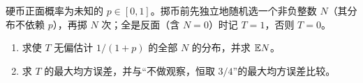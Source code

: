 \begin{exercise}[原讲义例 3.4]\label{ex2:randomN}
硬币正面概率为未知的 $p\in[0,1]$。掷币前先独立地随机选一个非负整数 $N$（其分布不依赖 $p$），再掷 $N$ 次；全是反面（含 $N=0$）时记 $T=1$，否则 $T=0$。
\begin{enumerate}
\item 求使 $T$ 无偏估计 $1/(1+p)$ 的全部 $N$ 的分布，并求 $\mathbb{E} N$。
\item 求 $T$ 的最大均方误差，并与“不做观察，恒取 $3/4$”的最大均方误差比较。
\end{enumerate}
\end{exercise}
